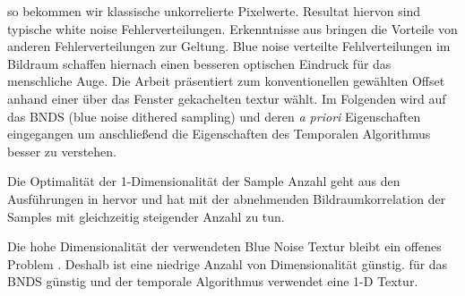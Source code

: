 so bekommen wir klassische unkorrelierte Pixelwerte. Resultat hiervon 
sind typische white noise Fehlerverteilungen. Erkenntnisse aus 
\cite{10.111712.152707} bringen die Vorteile von anderen Fehlerverteilungen
zur Geltung. Blue noise verteilte Fehlverteilungen im Bildraum schaffen hiernach 
einen besseren optischen Eindruck für das menschliche Auge. 
Die Arbeit \cite{georgiev2016blue} präsentiert zum konventionellen
gewählten Offset anhand einer über das Fenster gekachelten  
textur wählt. Im Folgenden wird auf das
BNDS (blue noise dithered sampling) und deren \textit{a priori} Eigenschaften 
eingegangen um anschließend die  Eigenschaften des 
Temporalen Algorithmus besser zu verstehen.

Die Optimalität der 1-Dimensionalität der Sample Anzahl geht aus den 
Ausführungen in \cite[S.3]{hal02158423} hervor und hat mit der 
abnehmenden Bildraumkorrelation der Samples mit gleichzeitig steigender
Anzahl zu tun.

Die hohe Dimensionalität der verwendeten Blue Noise Textur bleibt ein offenes 
Problem \cite{bluenoisechrisschied}. Deshalb ist eine niedrige Anzahl von 
Dimensionalität günstig.
für das BNDS günstig und der temporale Algorithmus verwendet eine 
1-D Textur. 

\label{alg:Grund für homogene Flächen}

